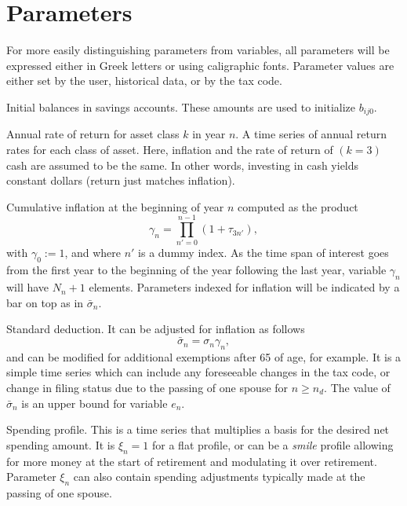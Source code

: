 \documentclass{report}[fleqn,11pt]
\begin{document}
\section{Parameters}
For more easily distinguishing parameters from variables, all parameters will be expressed
either in Greek letters or using caligraphic fonts.
Parameter values are either set by the user, historical data, or by the tax code.
\begin{description}[leftmargin=4em,style=multiline]
\item [$\beta_{ij}$]
	Initial balances in savings accounts. These amounts are used to initialize $b_{ij0}$.
\item [$\tau_{kn}$]
	Annual rate of return for asset class $k$ in year $n$.
	A time series of annual return rates for each class of asset.
	Here, inflation and the rate of return of $(k=3)$ cash are assumed to be the same.
	In other words, investing in cash yields constant dollars (return just matches inflation).
\item [$\gamma_n$]
	Cumulative inflation at the beginning of year $n$ computed as the product
	\begin{equation}
		\gamma_n = \prod_{n' = 0}^{n-1} (1 + \tau_{3n'}),
	\end{equation}
	with $\gamma_0 := 1$, and where $n'$ is a dummy index.
	As the time span of interest goes from the first year to the beginning
        of the year following the last year,
        variable $\gamma_n$ will have $N_n + 1$ elements.
	Parameters indexed for inflation will be indicated by a bar on top as in $\bar{\sigma}_n$.
\item [$\sigma_n$]
	Standard deduction. It can be adjusted for inflation as follows
	\begin{equation}
		\bar\sigma_n = \sigma_n \gamma_n,
	\end{equation}
	and can be modified for additional exemptions after 65 of age, for example.
	It is a simple time series
	which can include any foreseeable changes in the tax code, or change in filing status due to the
	passing of one spouse for $n\ge n_d$.  The value of $\bar{\sigma}_n$ is an upper bound for variable $e_n$.
\item [$\xi_{n}$]
	Spending profile. This is a time series that multiplies a basis for the desired net spending amount.
	It is $\xi_n =1$ for
	a flat profile, or can be a {\em smile} profile allowing for more money at the start
	of retirement and modulating it over retirement. Parameter
	$\xi_n$ can also contain spending adjustments typically made at the passing of one spouse.

\end{description}
\end{document}
